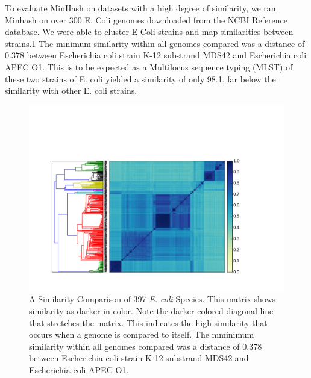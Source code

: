 \documentclass[12pt, letterpaper]{article}
\begin{document}
To evaluate MinHash on datasets with a high degree of similarity, we ran Minhash on over 300 E. Coli genomes downloaded from the NCBI Reference database. We were able to cluster E Coli strains and map similarities between strains.\ref{fig:All Ecoli} The minimum similarity within all genomes compared was a distance of 0.378 between Escherichia coli strain K-12 substrand MDS42 and Escherichia coli APEC O1. This is to be expected as a Multilocus sequence typing (MLST) of these two strains of E. coli yielded a similarity of only 98.1, far below the similarity with other E. coli strains.\cite{E coli}

\FloatBarrier
\begin{figure}[h]
    \centering
    \includegraphics[width=1.0\textwidth]{All_E_coli}
    \caption{A Similarity Comparison of 397 \textit{E. coli} Species. This matrix shows similarity as darker in color. Note the darker colored diagonal line that stretches the matrix. This indicates the high similarity that occurs when a genome is compared to itself. The mminimum similarity within all genomes compared was a distance of 0.378 between Escherichia coli strain K-12 substrand MDS42 and Escherichia coli APEC O1.}
    \label{fig:All Ecoli}
\end{figure}
\FloatBarrier
\end{document}
